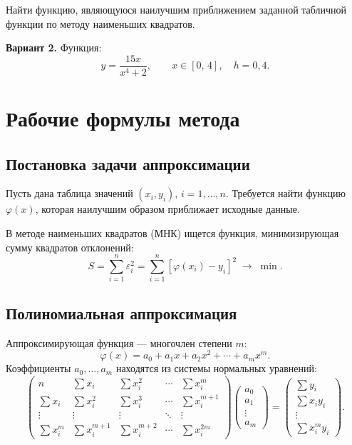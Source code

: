 \documentclass[a4paper,12pt]{article}
\begin{document}
Найти функцию, являющуюся наилучшим приближением заданной табличной функции по методу наименьших квадратов.

\textbf{Вариант 2.} Функция:
\[
    y = \frac{15x}{x^4 + 2}, \qquad x \in [0,\,4], \quad h = 0{,}4.
\]

\section{Рабочие формулы метода}

\subsection{Постановка задачи аппроксимации}

Пусть дана таблица значений $(x_i, y_i)$, $i = 1,\ldots,n$. Требуется найти функцию $\varphi(x)$, которая наилучшим образом приближает исходные данные.

В методе наименьших квадратов (МНК) ищется функция, минимизирующая сумму квадратов отклонений:
\[
    S = \sum_{i=1}^{n} \varepsilon_i^2 = \sum_{i=1}^{n} [\varphi(x_i) - y_i]^2 \;\longrightarrow\; \min.
\]

\subsection{Полиномиальная аппроксимация}

Аппроксимирующая функция — многочлен степени $m$:
\[
    \varphi(x) = a_0 + a_1 x + a_2 x^2 + \cdots + a_m x^m.
\]
Коэффициенты $a_0, \ldots, a_m$ находятся из системы нормальных уравнений:
\[
\begin{pmatrix}
n & \sum x_i & \sum x_i^2 & \cdots & \sum x_i^m \\
\sum x_i & \sum x_i^2 & \sum x_i^3 & \cdots & \sum x_i^{m+1} \\
\vdots & \vdots & \vdots & \ddots & \vdots \\
\sum x_i^m & \sum x_i^{m+1} & \sum x_i^{m+2} & \cdots & \sum x_i^{2m}
\end{pmatrix}
\begin{pmatrix} a_0 \\ a_1 \\ \vdots \\ a_m \end{pmatrix}
=
\begin{pmatrix} \sum y_i \\ \sum x_i y_i \\ \vdots \\ \sum x_i^m y_i \end{pmatrix}.
\]
\end{document}
